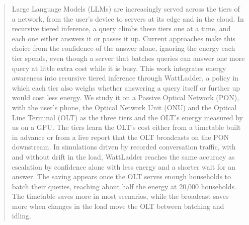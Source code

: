 \documentclass[cic,dipl,english]{infufrgs}
\begin{document}
\begin{abstract}
Large Language Models (LLMs) are increasingly served across the tiers of a network, from the
user's device to servers at its edge and in the cloud. In recursive tiered inference, a query climbs these tiers
one at a time, and each one either answers it or passes it up. Current approaches make this
choice from the confidence of the answer alone, ignoring the energy each tier spends, even
though a server that batches queries can answer one more query at little extra cost while it is
busy. This
work integrates energy awareness into recursive tiered
inference through WattLadder, a policy in which each tier also weighs whether answering a query
itself or further up would cost less energy. We study it on a Passive Optical Network (PON), with the user's
phone, the Optical Network Unit (ONU) and the Optical Line Terminal (OLT) as the three tiers and
the OLT's energy measured by us on a GPU. The tiers learn the OLT's cost either from a timetable
built in advance or from a live report that the OLT broadcasts on the PON downstream. In
simulations driven by
recorded conversation traffic, with and without drift in the load, WattLadder reaches the same
accuracy as escalation by confidence alone with less energy and a shorter wait for an answer.
The saving appears once the OLT serves enough households to batch their queries, reaching about
half the energy at 20,000 households. The timetable saves more in most scenarios, while the
broadcast saves more when changes in the load move the OLT between batching and idling.
\end{abstract}
\end{document}
